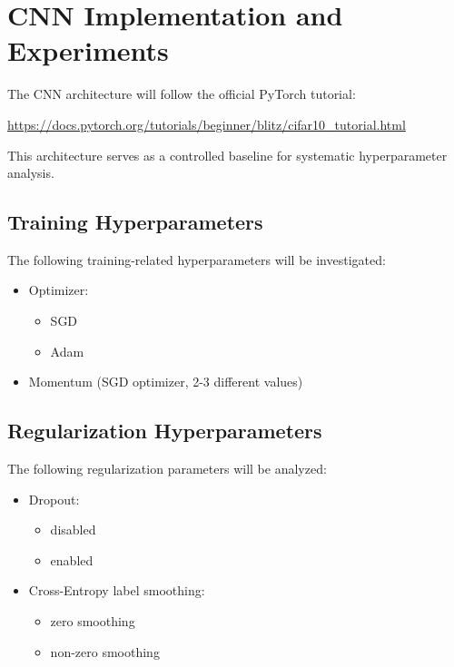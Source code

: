 \documentclass[11pt,a4paper]{article}
\begin{document}
\section{CNN Implementation and Experiments}

The CNN architecture will follow the official PyTorch tutorial:

\begin{center}
\url{https://docs.pytorch.org/tutorials/beginner/blitz/cifar10_tutorial.html}
\end{center}

This architecture serves as a controlled baseline for systematic hyperparameter analysis.

\subsection{Training Hyperparameters}

The following training-related hyperparameters will be investigated:

\begin{itemize}
    \item Optimizer:
    \begin{itemize}
        \item SGD
        \item Adam
    \end{itemize}
    \item Momentum (SGD optimizer, 2-3 different values)
\end{itemize}

\subsection{Regularization Hyperparameters}

The following regularization parameters will be analyzed:

\begin{itemize}
    \item Dropout:
    \begin{itemize}
        \item disabled
        \item enabled
    \end{itemize}
    \item Cross-Entropy label smoothing:
    \begin{itemize}
        \item zero smoothing
        \item non-zero smoothing
    \end{itemize}
\end{itemize}
\end{document}
